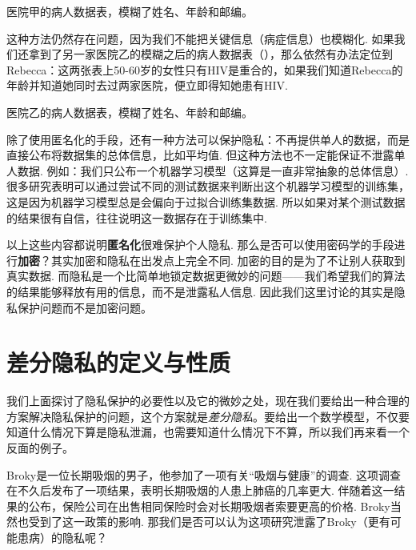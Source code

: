 \begin{table}[!ht]
\centering

\caption{医院甲的病人数据表，模糊了姓名、年龄和邮编。}
\label{tab:tab02}
\end{table}

这种方法仍然存在问题，因为我们不能把关键信息（病症信息）也模糊化. 如果我们还拿到了另一家医院乙的模糊之后的病人数据表（），那么依然有办法定位到Rebecca：这两张表上50-60岁的女性只有HIV是重合的，如果我们知道Rebecca的年龄并知道她同时去过两家医院，便立即得知她患有HIV.

\begin{table}[!ht]
\centering

\caption{医院乙的病人数据表，模糊了姓名、年龄和邮编。}
\label{tab:tab03}
\end{table}

除了使用匿名化的手段，还有一种方法可以保护隐私：不再提供单人的数据，而是直接公布将数据集的总体信息，比如平均值. 但这种方法也不一定能保证不泄露单人数据. 例如：我们只公布一个机器学习模型（这算是一直非常抽象的总体信息）. 很多研究表明可以通过尝试不同的测试数据来判断出这个机器学习模型的训练集，这是因为机器学习模型总是会偏向于过拟合训练集数据. 所以如果对某个测试数据的结果很有自信，往往说明这一数据存在于训练集中. 

\begin{remark}
以上这些内容都说明\textbf{匿名化}很难保护个人隐私. 那么是否可以使用密码学的手段进行\textbf{加密}？其实加密和隐私在出发点上完全不同. 加密的目的是为了不让别人获取到真实数据. 而隐私是一个比简单地锁定数据更微妙的问题——我们希望我们的算法的结果能够释放有用的信息，而不是泄露私人信息. 因此我们这里讨论的其实是隐私保护问题而不是加密问题。
\end{remark}

\section{差分隐私的定义与性质}

我们上面探讨了隐私保护的必要性以及它的微妙之处，现在我们要给出一种合理的方案解决隐私保护的问题，这个方案就是\emph{差分隐私}。要给出一个数学模型，不仅要知道什么情况下算是隐私泄漏，也需要知道什么情况下不算，所以我们再来看一个反面的例子。

Broky是一位长期吸烟的男子，他参加了一项有关“吸烟与健康”的调查. 这项调查在不久后发布了一项结果，表明长期吸烟的人患上肺癌的几率更大. 伴随着这一结果的公布，保险公司在出售相同保险时会对长期吸烟者索要更高的价格. Broky当然也受到了这一政策的影响. 那我们是否可以认为这项研究泄露了Broky（更有可能患病）的隐私呢？

